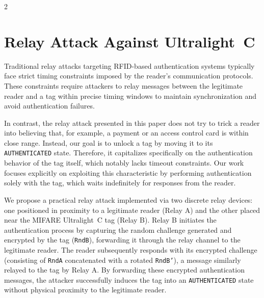 \documentclass[10pt,letterpaper]{article}
\begin{document}
\begin{multicols}{2}
\section{Relay Attack Against Ultralight~C}
\label{sec:relay}

Traditional relay attacks targeting RFID-based authentication systems typically face strict timing constraints imposed by the reader's communication protocols. These constraints require attackers to relay messages between the legitimate reader and a tag within precise timing windows to maintain synchronization and avoid authentication failures.

In contrast, the relay attack presented in this paper does not try to trick a reader into believing that, for example, a payment or an access control card is within close range. Instead, our goal is to unlock a tag by moving it to its \texttt{AUTHENTICATED} state.
Therefore, it capitalizes specifically on the authentication behavior of the tag itself, which notably lacks timeout constraints. Our work focuses explicitly on exploiting this characteristic by performing authentication solely with the tag, which waits indefinitely for responses from the reader.

We propose a practical relay attack implemented via two discrete relay devices: one positioned in proximity to a legitimate reader (Relay A) and the other placed near the MIFARE Ultralight~C tag (Relay B). Relay B initiates the authentication process by capturing the random challenge generated and encrypted by the tag (\texttt{RndB}), forwarding it through the relay channel to the legitimate reader. The reader subsequently responds with its encrypted challenge (consisting of \texttt{RndA} concatenated with a rotated \texttt{RndB'}), a message similarly relayed to the tag by Relay A. By forwarding these encrypted authentication messages, the attacker successfully induces the tag into an \texttt{AUTHENTICATED} state without physical proximity to the legitimate reader.

\vspace{5mm}
\hspace{-5mm}\resizebox{\columnwidth}{!}{}
\captionsetup{hypcap=false}
\label{fig:authprocessrelay}
\vspace{3.0mm}
\setlength{\parindent}{15pt}


\end{multicols}
\end{document}
